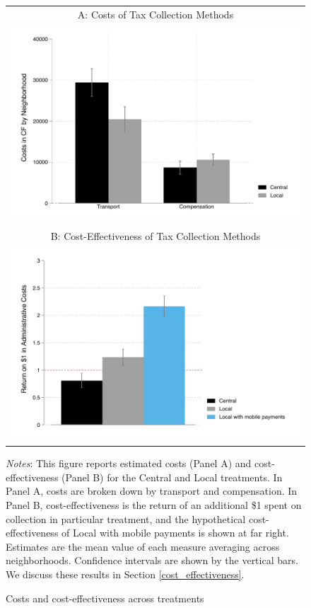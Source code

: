 \documentclass[12pt,english]{article}
\renewcommand{\footnotesize}{\fontsize{9pt}{11pt}\selectfont}\usepackage[unicode=true,
\begin{document}
\begin{figure}[H]
\centering{}\caption{Costs and cost-effectiveness across treatments \label{fig:costs_all}}
\begin{tabular}{c}
A: Costs of Tax Collection Methods \\
\includegraphics[scale=.8]{Output/costs_by_treatment.pdf} \\
\\
B: Cost-Effectiveness of Tax Collection Methods  \\
\includegraphics[scale=.8]{Output/Appdx_PaperFigure_marginal_revenue_hypothetical.pdf}\\
\end{tabular}
\parbox{6in}{\footnotesize \textit{Notes}: This figure reports estimated costs (Panel A) and cost-effectiveness (Panel B) for the Central and Local treatments. In Panel A, costs are broken down by transport and compensation. In Panel B, cost-effectiveness is the return of an additional \$1 spent on collection in particular treatment, and the hypothetical cost-effectiveness of Local with mobile payments is shown at far right. Estimates are the mean value of each measure averaging across neighborhoods.  Confidence intervals are shown by the vertical bars. We discuss these results in Section \ref{cost_effectiveness}.}
\end{figure}
\end{document}
